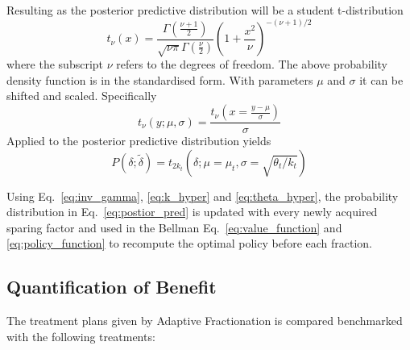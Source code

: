 \documentclass[\relativeRoot/ada.tex]{subfiles}
\begin{document}
Resulting as the posterior predictive distribution will be a student t-distribution
\begin{equation*}
    t_{\nu}(x)=\frac{\Gamma\left(\frac{\nu+1}{2}\right)}{\sqrt{\nu \pi} \Gamma\left(\frac{\nu}{2}\right)}\left(1+\frac{x^{2}}{\nu}\right)^{-(\nu+1) / 2}
\end{equation*}
where the subscript $\nu$ refers to the degrees of freedom. The above probability density function is in the standardised form. With parameters $\mu$ and $\sigma$ it can be shifted and scaled. Specifically
\begin{equation*}
    t_{\nu}(y; \mu, \sigma)=\frac{t_{\nu}\left(x=\frac{y - \mu}{\sigma}\right)}{\sigma}
\end{equation*}
Applied to the posterior predictive distribution yields
\begin{equation}\label{eq:postior_pred}
    P(\delta; \tilde{\delta}) = t_{2 k_t} (\delta; \mu = \mu_t, \sigma = \sqrt{\theta _t/ k_t})
\end{equation}

Using Eq.~\eqref{eq:inv_gamma}, \eqref{eq:k_hyper} and \eqref{eq:theta_hyper}, the probability distribution in Eq.~\eqref{eq:postior_pred} is updated with every newly acquired sparing factor and used in the Bellman Eq.~\eqref{eq:value_function} and \eqref{eq:policy_function} to recompute the optimal policy before each fraction.

\subsection{Quantification of Benefit}

The treatment plans given by Adaptive Fractionation is compared benchmarked with the following treatments:
\end{document}

